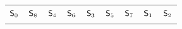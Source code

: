 \begin{tabular}{!{\color{white}\vrule} m{1em} !{\color{white}\vrule} m{1em} !{\color{white}\vrule} m{1em} m{1em} !{\color{white}\vrule} m{1em} m{1em} m{1em} !{\color{white}\vrule} m{1em} !{\color{white}\vrule} m{1em} !{\color{white}\vrule}}
	 &  &  &  &  &  \\
	\hline
	\(\mathsf{S}_{0}\) & \(\mathsf{S}_{8}\) & \(\mathsf{S}_{4}\) & \(\mathsf{S}_{6}\) & \(\mathsf{S}_{3}\) & \(\mathsf{S}_{5}\) & \(\mathsf{S}_{7}\) & \(\mathsf{S}_{1}\) & \(\mathsf{S}_{2}\) \\
	\hline
	 &  &  &  &  &  &  &  &  \\
\end{tabular}
